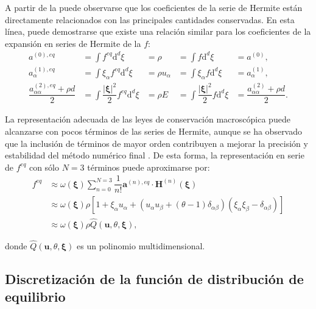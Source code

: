 A partir de la  puede observarse que los coeficientes de la serie de Hermite est\'an directamente relacionados con las principales cantidades conservadas. En esta l\'inea, puede demostrarse que existe una relaci\'on similar para los coeficientes de la expansi\'on en series de Hermite de la \fdp{} $f$:
\begin{subequations}
	\begin{align}
		a^{(0),eq} &= \int f^{eq} \mbox{d}^d \xi  &= \rho  &= \int f \mbox{d}^d \xi &= a^{(0)},   \\ 
		a^{(1),eq}_{\alpha} &= \int \xi_{\alpha}f^{eq} \mbox{d}^d \xi  &= \rho u_{\alpha}  &= \int \xi_{\alpha}f \mbox{d}^d \xi &= a^{(1)}_{\alpha},   \\ 		
		\dfrac{a^{(2),eq}_{\alpha\alpha}+\rho d}{2} &= \int \dfrac{|\bm{\xi}|^2}{2} f^{eq} \mbox{d}^d \xi  &= \rho E  &= \int \dfrac{|\bm{\xi}|^2}{2} f \mbox{d}^d \xi &= \dfrac{a^{(2)}_{\alpha\alpha}+\rho d}{2}.
	\end{align}
\end{subequations}

La representaci\'on adecuada de las leyes de conservaci\'on macrosc\'opica puede alcanzarse con pocos t\'erminos de las series de Hermite, aunque se ha observado que la inclusi\'on de t\'erminos de mayor orden contribuyen a mejorar la precisi\'on y estabilidad del m\'etodo num\'erico final \cite{dhumieres_multiple-relaxation-time_2002}. De esta forma, la representaci\'on en serie de $f^{eq}$ con s\'olo $N=3$ t\'erminos puede aproximarse por:
\begin{equation}
\begin{aligned}
	f^{eq} &\approx \omega(\bm{\xi}) \sum_{n=0}^{N=3} \dfrac{1}{n!}\bm{a}^{(n),eq} \cdot \bm{H}^{(n)}(\bm{\xi}) \\
	&\approx \omega(\bm{\xi}) \rho \left[ 1 + \xi_{\alpha}u_{\alpha} + \left( u_{\alpha}u_{\beta}+(\theta-1)\delta_{\alpha\beta} \right)\left(\xi_{\alpha}\xi_{\beta} - \delta_{\alpha\beta}\right) \right] \\
	&\approx \omega(\bm{\xi}) \rho \hat{Q}(\bm{u}, \theta, \bm{\xi}),
\end{aligned}
\end{equation}

donde $\hat{Q}(\bm{u}, \theta, \bm{\xi})$ es un polinomio multidimensional.



\subsection{Discretizaci\'on de la funci\'on de distribuci\'on de equilibrio}

